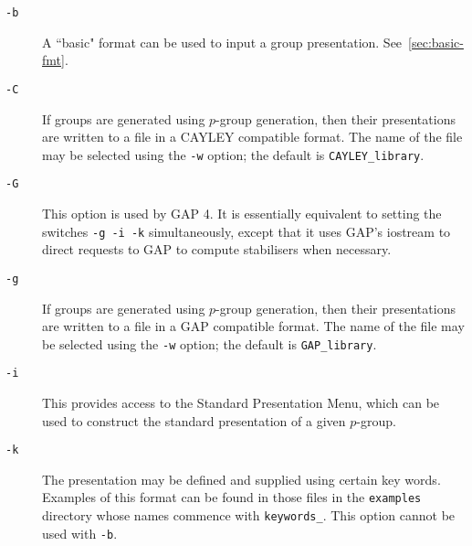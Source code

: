 \documentclass[12pt]{article}
\begin{document}
\enlargethispage*{1\baselineskip}
\begin{description}


\item[\texttt{-b}\hspace*{1em}]
      A ``basic" format can be used to input a group presentation.
      See~\ref{sec:basic-fmt}.

\item[\texttt{-C}\hspace*{1em}]
      If groups are generated using $p$-group generation, then 
      their presentations are written to a file
      in a CAYLEY compatible format.
      The name of the file may be selected using the \texttt{-w} option;
      the default is \texttt{CAYLEY\_library}.

\item[\texttt{-G}\hspace*{1em}]
      This option is used by {\sf GAP} 4. It is essentially equivalent
      to setting the switches \texttt{-g -i -k} simultaneously, except
      that it uses {\sf GAP}'s iostream to direct requests to {\sf GAP}
      to compute stabilisers when necessary.

\item[\texttt{-g}\hspace*{1em}]
      If groups are generated using $p$-group generation, then 
      their presentations are written to a file
      in a {\sf GAP} compatible format.
      The name of the file may be selected using the \texttt{-w} option;
      the default is \texttt{GAP\_library}.

\item[\texttt{-i}\hspace*{1em}]
      This provides access to the Standard Presentation Menu,
      which can be used to construct the standard presentation
      of a given $p$-group.

\item[\texttt{-k}\hspace*{1em}]
      The presentation may be defined and supplied using certain
      key words. Examples of this format can be found in those 
      files in the \texttt{examples} directory whose names commence with 
      \texttt{keywords\_}. This option cannot be used with \texttt{-b}.


\end{description}
\end{document}
